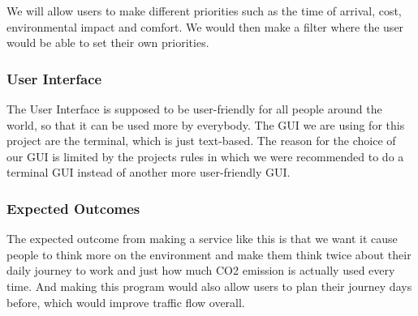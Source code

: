 We will allow users to make different priorities such as the time of arrival, cost, environmental impact and comfort.
We would then make a filter where the user would be able to set their own priorities.

\subsubsection{User Interface}

The User Interface is supposed to be user-friendly for all people around the world, so that it can be used more by
everybody.
The GUI we are using for this project are the terminal, which is just text-based.
The reason for the choice of our GUI is limited by the projects rules in which we were recommended to do a terminal GUI
instead of another more user-friendly GUI\@.

\subsubsection{Expected Outcomes}

The expected outcome from making a service like this is that we want it cause people to think more on the environment
and make them think twice about their daily journey to work and just how much CO2 emission is actually used every time.
And making this program would also allow users to plan their journey days before, which would improve traffic flow
overall.
